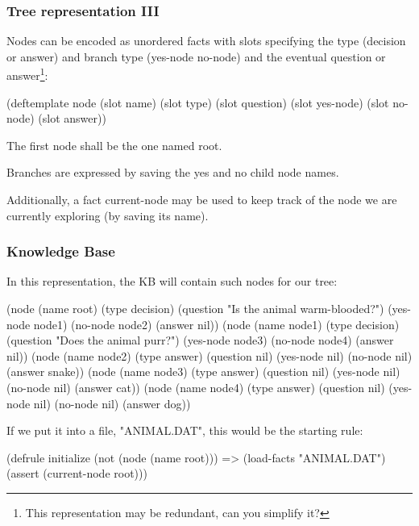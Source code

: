 \documentclass[xcolor={usenames,dvipsnames,svgnames}, compress]{beamer}
\begin{document}
\begin{frame}[fragile]
  \frametitle{Tree representation III}
  Nodes can be encoded as unordered facts with slots specifying the
  type (decision or answer) and branch type (yes-node no-node)
  and the eventual question or answer\footnote{This representation may
  be redundant, can you simplify it?}:
  \begin{clips-code}[numbers=none]
    (deftemplate node 
        (slot name) (slot type)
        (slot question) (slot yes-node)
        (slot no-node) (slot answer))
  \end{clips-code}

  The first node shall be the one named \textsf{root}.\par
  Branches are expressed by saving the yes and no child node names.\par\bigskip
  
  Additionally, a fact \textsf{current-node} may be used to keep track
  of the node we are currently exploring (by saving its name).\par
      
\end{frame}

\begin{frame}[fragile]
  \frametitle{Knowledge Base}
  In this representation, the KB will contain such nodes for our tree:
  \begin{clips-code}
    (node (name root) (type decision)  (question "Is the animal warm-blooded?") 
          (yes-node node1) (no-node node2) (answer nil))
    (node (name node1) (type decision) (question "Does the animal purr?") 
          (yes-node node3) (no-node node4) (answer nil))
    (node (name node2) (type answer) (question nil)
          (yes-node nil) (no-node nil) (answer snake))
    (node (name node3) (type answer) (question nil)
          (yes-node nil) (no-node nil) (answer cat))
    (node (name node4) (type answer) (question nil)
          (yes-node nil) (no-node nil) (answer dog))
        \end{clips-code}
        
  If we put it into a file, "ANIMAL.DAT", this would be the starting rule:
  \begin{clips-code}[numbers=none]
    (defrule initialize
        (not (node (name root)))
        =>
        (load-facts "ANIMAL.DAT") (assert (current-node root)))
  \end{clips-code}
\end{frame}
\end{document}

